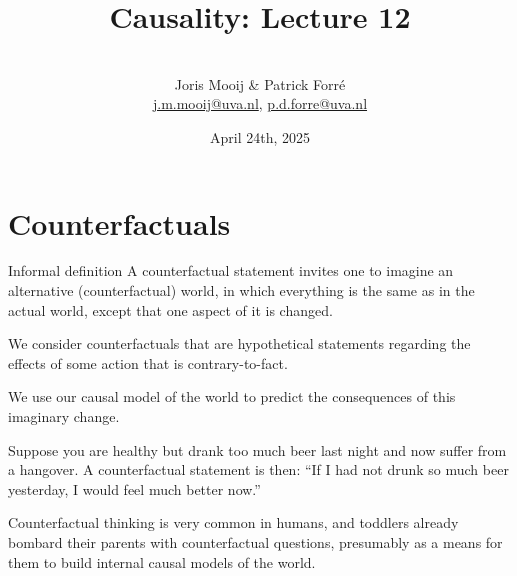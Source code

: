 \title[Causality]{Causality: Lecture 12}
\author[Joris Mooij]{\\[5mm]\large Joris Mooij \& Patrick Forr\'e\\
\url{j.m.mooij@uva.nl}, \url{p.d.forre@uva.nl}}
\date[2025-04-24]{\normalsize April 24th, 2025}
\maketitle



\part{Counterfactuals}
\frame{\partpage}

\begin{frame}{Informal definition}
  A counterfactual statement invites one to imagine an alternative (counterfactual) world, in which 
  everything is the same as in the actual world, except that one aspect of it is changed.

  \begin{definition}[Informal]
We consider counterfactuals that are hypothetical statements regarding the effects of some action that is contrary-to-fact.
  \end{definition}

  We use our causal model of the world to predict the consequences of this imaginary change.

  \begin{example}
  Suppose you are healthy but drank too much beer last night and now suffer from a hangover. 
  A counterfactual statement is then: ``If I had not drunk so much beer yesterday, I would feel much better now.''
  \end{example}

  Counterfactual thinking is very common in humans, and toddlers already bombard
  their parents with counterfactual questions, presumably as a means for them
  to build internal causal models of the world.
\end{frame}

